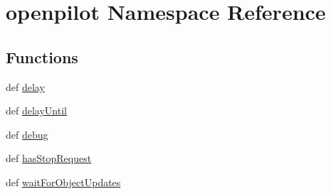 \hypertarget{namespaceopenpilot}{\section{openpilot \-Namespace \-Reference}
\label{namespaceopenpilot}
}
\subsection*{\-Functions}
\begin{DoxyCompactItemize}
\item 
def \hyperlink{namespaceopenpilot_ab8f7f8df27f540e59e0e42fddb67a4fb}{delay}
\item 
def \hyperlink{namespaceopenpilot_a9eb6d890272febed1ef5f96a3022c08d}{delay\-Until}
\item 
def \hyperlink{namespaceopenpilot_a73e0e8ed950877790185d24208d8a5e7}{debug}
\item 
def \hyperlink{namespaceopenpilot_a04d63804d12a055a648df7b624993199}{has\-Stop\-Request}
\item 
def \hyperlink{namespaceopenpilot_af904576c7f507a9787785a4329f61a25}{wait\-For\-Object\-Updates}
\end{DoxyCompactItemize}



